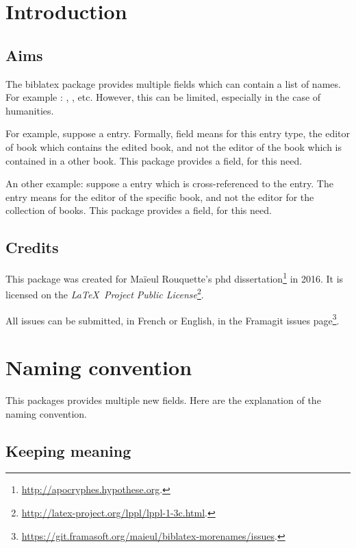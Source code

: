 \documentclass{ltxdockit}[2011/03/25]
\newcommand{\biblatex}{biblatex\xspace}
\begin{document}
\printtitlepage
\tableofcontents

\section{Introduction}

\subsection{Aims}
The \biblatex package provides multiple fields which can contain a list of names. For example : , ,  etc.
However, this can be limited, especially in the case of humanities.

For example, suppose a  entry. Formally,  field means for this  entry type, the editor of book which contains the edited book, and not the editor of the book which is contained in a other book. This package provides a  field, for this need.

An other example: suppose a  entry which is cross-referenced to the 
 entry. The  entry means for the editor of the specific book, and not the editor for the collection of books. 
This package provides a  field, for this need. 
\subsection{Credits}

This package was created for Maïeul Rouquette's phd dissertation\footnote{\url{http://apocryphes.hypothese.org}.} in 2016. It is licensed on the \emph{\LaTeX\ Project Public License}\footnote{\url{http://latex-project.org/lppl/lppl-1-3c.html}.}. 


All issues can be submitted, in French or English, in the Framagit  issues page\footnote{\url{https://git.framasoft.org/maieul/biblatex-morenames/issues}.}.


\section{Naming convention}
This packages provides multiple new fields. Here are the explanation of the naming convention.
\subsection{Keeping meaning}
\end{document}
